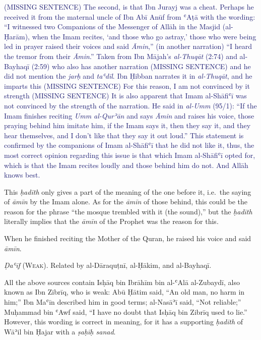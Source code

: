 \textcolor{MidnightBlue}{(MISSING SENTENCE) The
second, is that Ibn Jurayj was a cheat. Perhaps he received it from the
maternal uncle of Ibn Abī Anūf from ʿAṭā with the wording: ``I witnessed
two Companions of the Messenger of Allāh \pbuh in the Masjid (al-Ḥarām),
when the Imam recites, `and those who go astray,' those who were being
led in prayer raised their voices and said \emph{Āmin},'' (in another
narration) ``I heard the tremor from their \emph{Āmin}.'' Taken from Ibn
Mājah's \emph{al-Thuqāt} (2:74) and al-Bayhaqī (2:59) who also has
another narration (MISSING SENTENCE) and he did not mention the
\emph{jarḥ} and \emph{taʿdīl}. Ibn Ḥibban narrates it in
\emph{al-Thuqāt}, and he imparts this (MISSING SENTENCE) For this
reason, I am not convinced by it strength (MISSING SENTENCE) It is also
apparent that Imam al-Shāfiʿī was not convinced by the strength of the
narration. He said in \emph{al-Umm} (95/1): ``If the Imam finishes
reciting \emph{Umm al-Qurʾān} and says \emph{Āmin} and raises his voice,
those praying behind him imitate him, if the Imam says it, then they say
it, and they hear themselves, and I don't like that they say it out
loud.'' This statement is confirmed by the companions of Imam al-Shāfiʿī
that he did not like it, thus, the most correct opinion regarding this
issue is that which Imam al-Shāfiʿī opted for, which is that the Imam
recites loudly and those behind him do not. And Allāh knows best.}

This \emph{ḥadīth} only gives a part of the meaning of the one before
it, i.e.~the saying of \emph{āmīn} by the Imam alone. As for the
\emph{āmīn} of those behind, this could be the reason for the phrase
``the mosque trembled with it (the sound),'' but the \emph{ḥadīth}
literally implies that the \emph{āmīn} of the Prophet \pbuh was the
reason for this.

\begin{mdframed}[style=narration, frametitle={Narration}]
When he finished reciting the Mother of the Quran, he raised his voice and said \textit{āmīn}.
\end{mdframed}

\emph{Ḍaʿīf} (\textsc{Weak}). Related by al-Dāraquṭnī, al-Ḥākim, and
al-Bayhaqī.

All the above sources contain Isḥāq bin Ibrāhīm bin al-ʿAlā al-Zubaydī,
also known as Ibn Zibrīq, who is weak: Abū Ḥātim said, ``An old man, no
harm in him;'' Ibn Maʿīn described him in good terms; al-Nasāʾī said,
``Not reliable;'' Muḥammad bin ʿAwf said, ``I have no doubt that Isḥāq
bin Zibrīq used to lie.'' However, this wording is correct in meaning,
for it has a supporting \emph{ḥadīth} of Wāʾil bin Ḥajar with a
\emph{ṣaḥīḥ sanad}.

